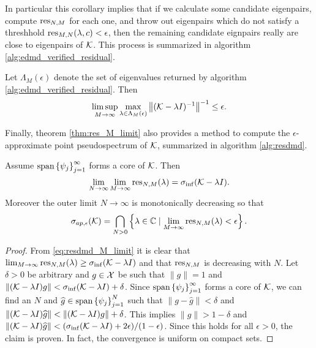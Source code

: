 In particular this corollary implies that if we calculate some candidate eigenpairs, 
compute $\text{res}_{N,M}$ for each one, and throw out eigenpairs which do not satisfy 
a threshhold $\text{res}_{M,N} (\lambda, c) < \epsilon$, then the remaining candidate 
eignpairs really are close to eigenpairs of $\mathcal{K}$. This process is summarized in 
algorithm \ref{alg:edmd_verified_residual}. 

\begin{corollary}
    Let $\Lambda_M (\epsilon)$ denote the set of eigenvalues returned by algorithm 
    \ref{alg:edmd_verified_residual}. Then 
    \begin{equation}
        \limsup_{M \to \infty} \max_{\lambda \in \Lambda_M (\epsilon)}
        \left\| (\mathcal{K} - \lambda I)^{-1} \right\|^{-1} \leq \epsilon . 
    \end{equation}
\end{corollary}

Finally, theorem \ref{thm:res_M_limit} also provides a method to compute the 
$\epsilon$-approximate point pseudospectrum of $\mathcal{K}$, summarized in 
algorithm \ref{alg:resdmd}. 

\begin{corollary}
    \label{cor:K_ap_epsilon}
    Assume $\text{span} \left\{ \psi_j \right\}_{j=1}^\infty$ forms a core of $\mathcal{K}$. 
    Then
    \begin{equation}
        \lim_{N \to \infty} \lim_{M \to \infty} \text{res}_{N,M} (\lambda) 
        = \sigma_{\inf} (\mathcal{K} - \lambda I) . 
    \end{equation}
    Moreover the outer limit $N \to \infty$ is monotonically decreasing so that 
    \begin{equation}
        \sigma_{ap, \epsilon} (\mathcal{K}) = 
        \bigcap_{N > 0} \left\{ \lambda \in \mathbb{C} \mid 
        \lim_{M \to \infty} \text{res}_{N,M} (\lambda) < \epsilon \right\} . 
    \end{equation}
\end{corollary}

\begin{proof}
    From \ref{eq:resdmd_M_limit} it is clear that 
    $\lim_{M \to \infty} \text{res}_{N,M} (\lambda) \geq \sigma_{\inf} (\mathcal{K} - \lambda I)$
    and that $\text{res}_{N,M}$ is decreasing with $N$. Let $\delta > 0$ be arbitrary and 
    $g \in \mathcal{X}$ be such that $\|g\|=1$ and 
    $\left\| (\mathcal{K} - \lambda I) g \right\| < \sigma_{\inf} (\mathcal{K} - \lambda I) + \delta$. 
    Since $\text{span} \left\{ \psi_j \right\}_{j=1}^\infty$ forms a core of $\mathcal{K}$, 
    we can find an $N$ and $\widehat{g} \in \text{span} \left\{ \psi_j \right\}_{j=1}^N$ 
    such that $\| g - \widehat{g} \| < \delta$ and 
    $\left\| (\mathcal{K} - \lambda I) \widehat{g} \right\| < 
    \left\| (\mathcal{K} - \lambda I) g \right\| + \delta$. This implies 
    $\| \widehat{g} \| > 1- \delta$ and $\left\| (\mathcal{K} - \lambda I) \widehat{g} \right\| < 
    (\sigma_{\inf} (\mathcal{K} - \lambda I) + 2\epsilon) / (1 - \epsilon)$. Since this holds 
    for all $\epsilon > 0$, the claim is proven. In fact, the convergence is uniform on 
    compact sets. 
\end{proof}

